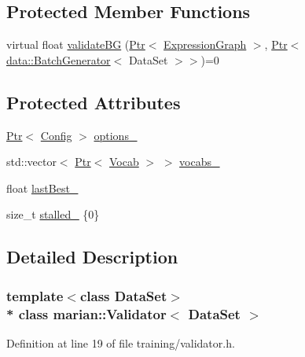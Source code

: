 \subsection*{Protected Member Functions}
\begin{DoxyCompactItemize}
\item 
virtual float \hyperlink{classmarian_1_1Validator_a62416349540dc2b628b70b4f401c4a49}{validate\+BG} (\hyperlink{namespacemarian_ad1a373be43a00ef9ce35666145137b08}{Ptr}$<$ \hyperlink{classmarian_1_1ExpressionGraph}{Expression\+Graph} $>$, \hyperlink{namespacemarian_ad1a373be43a00ef9ce35666145137b08}{Ptr}$<$ \hyperlink{classmarian_1_1data_1_1BatchGenerator}{data\+::\+Batch\+Generator}$<$ Data\+Set $>$$>$)=0
\end{DoxyCompactItemize}
\subsection*{Protected Attributes}
\begin{DoxyCompactItemize}
\item 
\hyperlink{namespacemarian_ad1a373be43a00ef9ce35666145137b08}{Ptr}$<$ \hyperlink{classmarian_1_1Config}{Config} $>$ \hyperlink{classmarian_1_1Validator_a59fc30678618608874029374e386d3c0}{options\+\_\+}
\item 
std\+::vector$<$ \hyperlink{namespacemarian_ad1a373be43a00ef9ce35666145137b08}{Ptr}$<$ \hyperlink{classmarian_1_1Vocab}{Vocab} $>$ $>$ \hyperlink{classmarian_1_1Validator_ae6afb9838529db124fcc1aa8f0cb1fc9}{vocabs\+\_\+}
\item 
float \hyperlink{classmarian_1_1Validator_a6fbe055b2a8c2341172091b2bbde0a59}{last\+Best\+\_\+}
\item 
size\+\_\+t \hyperlink{classmarian_1_1Validator_a9fe2c3f4b9b5f38d1a2db2a9ba8704e8}{stalled\+\_\+} \{0\}
\end{DoxyCompactItemize}


\subsection{Detailed Description}
\subsubsection*{template$<$class Data\+Set$>$\\*
class marian\+::\+Validator$<$ Data\+Set $>$}



Definition at line 19 of file training/validator.\+h.



